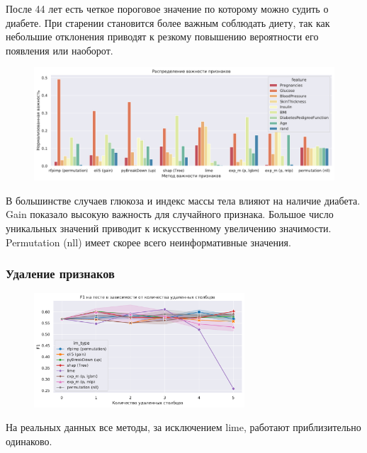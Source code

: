 \documentclass[12pt]{article}
\begin{document}
После 44 лет есть четкое пороговое значение по которому можно судить о диабете. При старении становится более важным соблюдать диету, так как небольшие отклонения приводят к резкому повышению вероятности его появления или наоборот.

\newpage
\begin{figure}[h]
\centering
\includegraphics[width=\textwidth]{images/diabets_TargetSum_impFeatures.pdf}
\end{figure}

В большинстве случаев глюкоза и индекс массы тела влияют на наличие диабета. Gain показало высокую важность для случайного признака. Большое число уникальных значений приводит к искусственному увеличению значимости. Permutation (nll) имеет скорее всего неинформативные значения. 

\subsubsection{Удаление признаков}
\begin{figure}[h]
\centering
\includegraphics[width=0.7\textwidth]{images/diabets_RFE_f1.pdf}
\end{figure}

На реальных данных все методы, за исключением lime, работают приблизительно одинаково. 

\newpage
\end{document}
